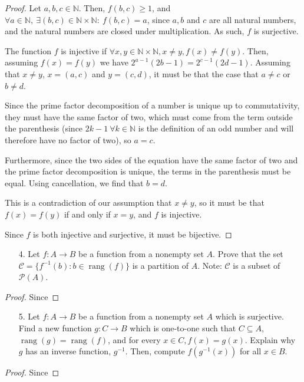 \documentclass[10pt]{article}
\theoremstyle{definition}
\theoremstyle{plain}
\newcommand{\N}{\mathbb{N}}
\DeclareMathOperator\rang{rang}
\begin{document}
\begin{proof}
  Let $a,b,c\in\N$. Then, $f(b,c)\geq 1$, and $\forall a\in\N,\ \exists (b,c)\in\N\times\N:\ f(b,c)=a$, since $a,b$ and $c$ are all natural numbers, and the natural numbers are closed under multiplication. As such, $f$ is surjective.

  The function $f$ is injective if $\forall x,y\in\N\times\N, x\neq y, f(x)\neq f(y).$ Then, assuming $f(x)=f(y)$ we have $2^{a-1} (2b-1) = 2^{c-1} (2d-1).$ Assuming that $x\neq y$, $x=(a,c)$ and $y=(c,d)$, it must be that the case that $a\neq c$ or $b\neq d$.

  Since the prime factor decomposition of a number is unique up to commutativity, they must have the same factor of two, which must come from the term outside the parenthesis (since $2k-1 \ \forall k\in\N$ is the definition of an odd number and will therefore have no factor of two), so $a=c$.

  Furthermore, since the two sides of the equation have the same factor of two and the prime factor decomposition is unique, the terms in the parenthesis must be equal. Using cancellation, we find that $b=d$.

  This is a contradiction of our assumption that $x\neq y$, so it must be that $f(x)=f(y)$ if and only if $x=y$, and $f$ is injective.

  Since $f$ is both injective and surjective, it must be bijective.
\end{proof}


\pagebreak



\begin{enumerate}
\item[4.] Let $f:A \to B$ be a function from a nonempty set $A$.  Prove that the set $ \mathcal{C} = \{f^{-1}(b): b \in \rang(f)\}$ is a partition of $A$.  Note:  $\mathcal{C}$ is a subset of $\mathscr{P}(A)$.
\end{enumerate}



\begin{proof}
  Since
\end{proof}



\pagebreak



\begin{enumerate}
\item[5.] Let $f:A \to B$ be a function from a nonempty set $A$ which is surjective.  Find a new function $g:C \to B$ which is one-to-one such that $C \subseteq A$, $\rang(g) = \rang(f)$, and for every $x \in C, f(x) = g(x)$.  Explain why $g$ has an inverse function, $g^{-1}$.  Then, compute $f(g^{-1}(x))$ for all $x \in B$.
\end{enumerate}



\begin{proof}
  Since
\end{proof}
\end{document}
